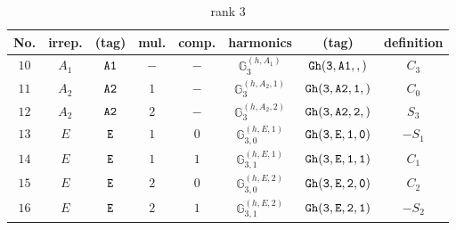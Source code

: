 \documentclass[fleqn,8pt]{jsarticle}
\begin{document}
\begin{table}[ht!]
\begin{center}
\caption{rank 3}
\renewcommand{\arraystretch}{1.3}
\begin{tabular}{cccccccc} \hline \hline
No. & irrep. & (tag) & mul. & comp. & harmonics & (tag) & definition \\ \hline
$ 10 $ & $ A_{1} $ & $ {\tt A1} $ & $ - $ & $ - $ & $ \mathbb{G}_{3}^{(h,A_{1})} $ & $ {\tt Gh(3,A1,,)} $ & $ C_{3} $ \\
$ 11 $ & $ A_{2} $ & $ {\tt A2} $ & $ 1 $ & $ - $ & $ \mathbb{G}_{3}^{(h,A_{2},1)} $ & $ {\tt Gh(3,A2,1,)} $ & $ C_{0} $ \\
$ 12 $ & $ A_{2} $ & $ {\tt A2} $ & $ 2 $ & $ - $ & $ \mathbb{G}_{3}^{(h,A_{2},2)} $ & $ {\tt Gh(3,A2,2,)} $ & $ S_{3} $ \\
$ 13 $ & $ E $ & $ {\tt E} $ & $ 1 $ & $ 0 $ & $ \mathbb{G}_{3,0}^{(h,E,1)} $ & $ {\tt Gh(3,E,1,0)} $ & $ - S_{1} $ \\
$ 14 $ & $ E $ & $ {\tt E} $ & $ 1 $ & $ 1 $ & $ \mathbb{G}_{3,1}^{(h,E,1)} $ & $ {\tt Gh(3,E,1,1)} $ & $ C_{1} $ \\
$ 15 $ & $ E $ & $ {\tt E} $ & $ 2 $ & $ 0 $ & $ \mathbb{G}_{3,0}^{(h,E,2)} $ & $ {\tt Gh(3,E,2,0)} $ & $ C_{2} $ \\
$ 16 $ & $ E $ & $ {\tt E} $ & $ 2 $ & $ 1 $ & $ \mathbb{G}_{3,1}^{(h,E,2)} $ & $ {\tt Gh(3,E,2,1)} $ & $ - S_{2} $ \\
 \hline \hline
\end{tabular}
\end{center}
\end{table}
\end{document}
